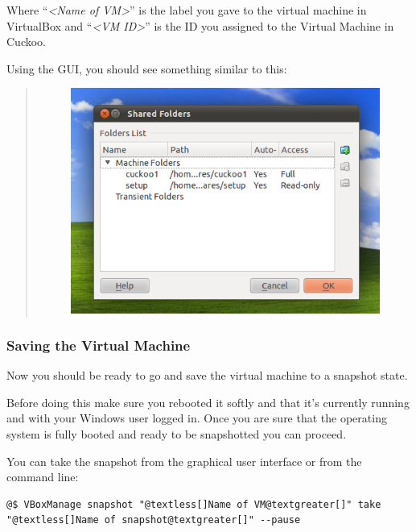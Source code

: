 \documentclass[letterpaper,10pt,english]{sphinxmanual}
\begin{document}
Where ``\emph{\textless{}Name of VM\textgreater{}}'' is the label you gave to the virtual machine in VirtualBox
and ``\emph{\textless{}VM ID\textgreater{}}'' is the ID you assigned to the Virtual Machine in Cuckoo.

Using the GUI, you should see something similar to this:
\begin{quote}
\begin{figure}[htbp]
\centering

\includegraphics{shared_folders.png}
\end{figure}
\end{quote}


\subsubsection{Saving the Virtual Machine}
\label{installation/guest/saving:saving-the-virtual-machine}\label{installation/guest/saving::doc}
Now you should be ready to go and save the virtual machine to a snapshot state.

Before doing this make sure you rebooted it softly and that it's currently
running and with your Windows user logged in. Once you are sure that the
operating system is fully booted and ready to be snapshotted you can proceed.

You can take the snapshot from the graphical user interface or from the command
line:

\begin{Verbatim}[commandchars=@\[\]]
@$ VBoxManage snapshot "@textless[]Name of VM@textgreater[]" take "@textless[]Name of snapshot@textgreater[]" --pause
\end{Verbatim}
\end{document}
